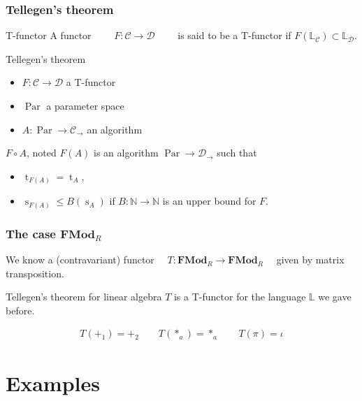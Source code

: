 \documentclass[10pt]{beamer}
\newcommand{\cat}[1]{\mathscr{#1}}
\newcommand{\lcat}[1]{\mathbf{#1}}
\newcommand{\C}{\cat{C}}
\newcommand{\D}{\cat{D}}
\renewcommand{\L}{\cat{L}}
\newcommand{\comp}{\circ}
\newcommand{\N}{\mathbb{N}}
\renewcommand{\L}{\mathbb{L}}
\newcommand{\ra}{\rightarrow}
\DeclareMathOperator{\Time}{t}
\DeclareMathOperator{\Space}{s}
\DeclareMathOperator{\Par}{Par}
\begin{document}
\begin{frame}
  \frametitle{Tellegen's theorem}

  \begin{block}{T-functor}
    A functor $\qquad F:\C\ra\D \qquad$ is said to be a T-functor if
    $F(\L_\C) \subset \L_\D$.
  \end{block}

  \begin{block}{Tellegen's theorem}
    \begin{itemize}
    \item $F:\C\ra\D$ a T-functor
    \item $\Par$ a parameter space
    \item $A:\Par\ra\C_\ra$ an algorithm
    \end{itemize}

    $F\comp A$, noted $F(A)$ is an algorithm $\Par\ra\D_\ra$ such that
    \begin{itemize}
    \item $\Time_{F(A)} = \Time_A$,
    \item $\Space_{F(A)} \le B(\Space_A)$ if $B:\N\ra\N$ is an upper
      bound for $F$.
    \end{itemize}
  \end{block}
\end{frame}


\begin{frame}
  \frametitle{The case $\lcat{FMod}_R$}
  
  \begin{center}
    We know a (contravariant) functor $\quad
    T:\lcat{FMod}_R\ra\lcat{FMod}_R\quad$ given by matrix
    transposition.
  \end{center}

  \begin{block}{Tellegen's theorem for linear algebra}
    $T$ is a T-functor for the language $\L$ we gave before.
  \end{block}

  \begin{align*}
    T(+_1) = +_2 \qquad T(*_a) = *_a \qquad T(\pi) = \iota
  \end{align*}
\end{frame}



\section{Examples}
\end{document}
